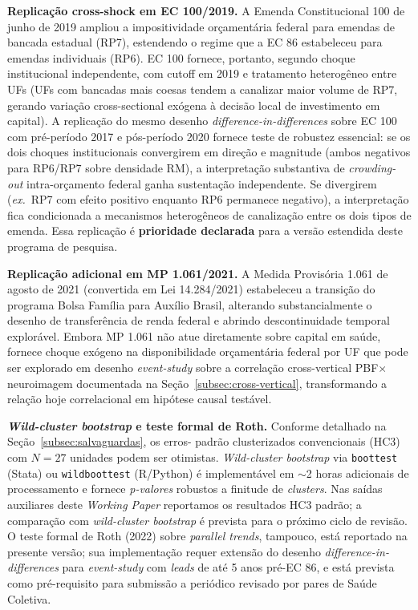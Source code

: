 \documentclass[12pt,a4paper,oneside]{article}
\begin{document}
\textbf{Replicação cross-shock em EC 100/2019.} A Emenda
Constitucional 100 de junho de 2019 ampliou a impositividade
orçamentária federal para emendas de bancada estadual (RP7),
estendendo o regime que a EC 86 estabeleceu para emendas
individuais (RP6). EC 100 fornece, portanto, segundo choque
institucional independente, com cutoff em 2019 e tratamento
heterogêneo entre UFs (UFs com bancadas mais coesas tendem a
canalizar maior volume de RP7, gerando variação cross-sectional
exógena à decisão local de investimento em capital). A replicação
do mesmo desenho \textit{difference-in-differences} sobre EC 100
\textemdash{} com pré-período 2017 e
pós-período 2020 \textemdash{} fornece teste de
robustez essencial: se os dois choques institucionais convergirem
em direção e magnitude (ambos negativos para RP6/RP7 sobre
densidade RM), a interpretação substantiva de \textit{crowding-
out} intra-orçamento federal ganha sustentação independente. Se
divergirem (\textit{ex.}\ RP7 com efeito positivo enquanto RP6
permanece negativo), a interpretação fica condicionada a
mecanismos heterogêneos de canalização entre os dois tipos de
emenda. Essa replicação é \textbf{prioridade declarada} para a
versão estendida deste programa de pesquisa.

\textbf{Replicação adicional em MP 1.061/2021.} A Medida
Provisória 1.061 de agosto de 2021 (convertida em Lei 14.284/2021)
estabeleceu a transição do programa Bolsa Família para Auxílio
Brasil, alterando substancialmente o desenho de transferência de
renda federal e abrindo descontinuidade temporal explorável. Embora
MP 1.061 não atue diretamente sobre capital em saúde, fornece
choque exógeno na disponibilidade orçamentária federal por UF que
pode ser explorado em desenho \textit{event-study} sobre a
correlação cross-vertical PBF$\times$neuroimagem documentada na
Seção~\ref{subsec:cross-vertical}, transformando a relação hoje
correlacional em hipótese causal testável.

\textbf{\textit{Wild-cluster bootstrap} e teste formal de Roth.}
Conforme detalhado na Seção~\ref{subsec:salvaguardas}, os erros-
padrão clusterizados convencionais (HC3) com $N=27$ unidades
podem ser otimistas. \textit{Wild-cluster bootstrap} via
\texttt{boottest} (Stata) ou \texttt{wildboottest} (R/Python) é
implementável em $\sim$2 horas adicionais de processamento e fornece
\textit{p-valores} robustos a finitude de \textit{clusters}. Nas
saídas auxiliares deste \textit{Working Paper} reportamos os
resultados HC3 padrão; a comparação com \textit{wild-cluster
bootstrap} é prevista para o próximo ciclo de revisão. O teste
formal de Roth (2022) sobre \textit{parallel trends}, tampouco,
está reportado na presente versão; sua implementação requer
extensão do desenho \textit{difference-in-differences} para
\textit{event-study} com \textit{leads} de até 5 anos pré-EC 86,
e está prevista como pré-requisito para submissão a periódico
revisado por pares de Saúde Coletiva.
\end{document}
